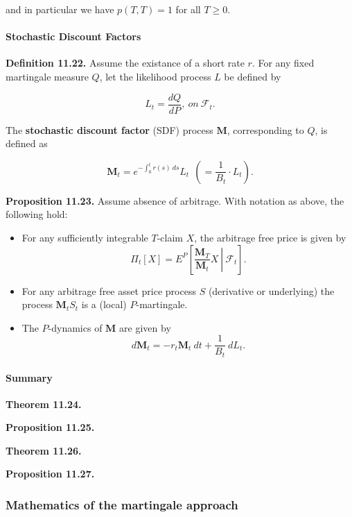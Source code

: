 \documentclass[
]{article}
\providecommand{\tightlist}{%
  \setlength{\itemsep}{0pt}\setlength{\parskip}{0pt}}
\begin{document}
and in particular we have \(p(T,T)=1\) for all \(T\ge 0\).

\hypertarget{stochastic-discount-factors-1}{%
\paragraph{Stochastic Discount
Factors}\label{stochastic-discount-factors-1}}

\textbf{Definition 11.22.} Assume the existance of a short rate \(r\).
For any fixed martingale measure \(Q\), let the likelihood process \(L\)
be defined by

\[
L_t=\frac{dQ}{dP},\ on\ \mathcal{F}_t.
\]

The \textbf{stochastic discount factor} (SDF) process \(\mathbf{M}\),
corresponding to \(Q\), is defined as

\[
\mathbf{M}_t=e^{-\int_0^tr(s)\ ds}L_t\ \ \left(=\frac{1}{B_t}\cdot L_t\right).
\]

\textbf{Proposition 11.23.} Assume absence of arbitrage. With notation
as above, the following hold:

\begin{itemize}
\tightlist
\item
  For any sufficiently integrable \(T\)-claim \(X\), the arbitrage free
  price is given by \[
    \Pi_t[X]=E^P\left[\left. \frac{\mathbf{M}_T}{\mathbf{M}_t} X \ \right\vert\ \mathcal{F}_t\right].
    \]
\item
  For any arbitrage free asset price process \(S\) (derivative or
  underlying) the process \(\mathbf{M}_tS_t\) is a (local)
  \(P\)-martingale.
\item
  The \(P\)-dynamics of \(\mathbf{M}\) are given by \[
    d\mathbf{M}_t=-r_t\mathbf{M}_t\ dt+\frac{1}{B_t}\ dL_t.
    \]
\end{itemize}

\hypertarget{summary}{%
\paragraph{Summary}\label{summary}}

\textbf{Theorem 11.24.}

\textbf{Proposition 11.25.}

\textbf{Theorem 11.26.}

\textbf{Proposition 11.27.}

\hypertarget{mathematics-of-the-martingale-approach}{%
\subsubsection{Mathematics of the martingale
approach}\label{mathematics-of-the-martingale-approach}}
\end{document}
